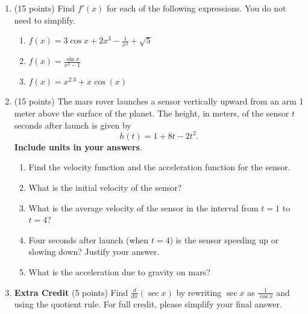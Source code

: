 \documentclass[12pt]{article}
\begin{document}
\begin{enumerate}
\newpage

\item (15 points) Find $f'(x)$ for each of the following expressions. You do not need to simplify.

	\begin{enumerate}
	\item $f(x) = 3\cos x + 2x^3 - \frac{1}{x^2}+\sqrt{5}$
        \vfill
       
    \item $f(x)=\frac{\sin x}{x^3-1}$
        \vfill
        \item $f(x)= x^{2.3} + x \cos(x)$
       \vfill
	\end{enumerate}
\newpage
\item (15 points) The mars rover launches a sensor vertically upward from an arm 1 meter above the surface of the planet. The height, in meters, of the sensor $t$ seconds after launch is given by $$h(t)=1+8t-2t^2.$$ {\bf Include units in your answers}.

	\begin{enumerate}
	\item Find the velocity function and the acceleration function for the sensor.\\
	\vfill

	\item What is the initial velocity of the sensor?\\ \vfill

	\item What is the average velocity of the sensor in the interval from $t=1$ to $t=4$?\\ \vfill


	\item Four seconds after launch (when $t=4$) is the sensor speeding up or slowing down? Justify your answer.\\ \vfill

	\item What is the acceleration due to gravity on mars?\\ \vspace{.5in}

\end{enumerate}
\newpage
\item \textbf{Extra Credit} (5 points) Find $\frac{d}{dx}\left(\sec x\right)$ by rewriting $\sec x$ as $\frac{1}{\cos x}$ and using the quotient rule. For full credit, please simplify your final answer.

\vfill
\end{enumerate}
\end{document}
